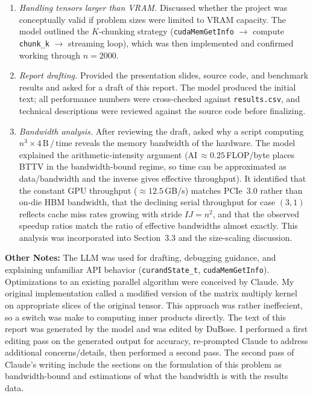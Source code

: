 \documentclass[11pt]{article}
\begin{document}
\begin{enumerate}
  \item \textit{Handling tensors larger than VRAM.} Discussed whether the
        project was conceptually valid if problem sizes were limited to VRAM
        capacity.  The model outlined the $K$-chunking strategy
        (\texttt{cudaMemGetInfo} $\to$ compute \texttt{chunk\_k} $\to$
        streaming loop), which was then implemented and confirmed working
        through $n{=}2000$.

  \item \textit{Report drafting.} Provided the presentation slides, source
        code, and benchmark results and asked for a draft of this report.
        The model produced the initial text; all performance numbers were
        cross-checked against \texttt{results.csv}, and technical descriptions
        were reviewed against the source code before finalizing.

  \item \textit{Bandwidth analysis.} After reviewing the draft, asked why a
        script computing $n^3 \times 4\,\text{B}\,/\,\text{time}$ reveals the
        memory bandwidth of the hardware.  The model explained the
        arithmetic-intensity argument (AI\,$\approx 0.25$\,FLOP/byte places
        BTTV in the bandwidth-bound regime, so time can be approximated as data/bandwidth
        and the inverse gives effective throughput).  It identified that the
        constant GPU throughput (${\approx}12.5$\,GB/s) matches PCIe~3.0 rather
        than on-die HBM bandwidth, that the declining serial throughput for
        case $(3,1)$ reflects cache miss rates growing with stride $IJ=n^2$,
        and that the observed speedup ratios match the ratio of effective
        bandwidths almost exactly.  This analysis was incorporated into
        Section~3.3 and the size-scaling discussion.
\end{enumerate}

\textbf{Other Notes:} 
The LLM was used for drafting, debugging guidance, and explaining
unfamiliar API behavior (\texttt{curandState\_t}, \texttt{cudaMemGetInfo}). 
Optimizations to an existing parallel algorithm were conceived by Claude.
My original implementation called a modified version of the matrix multiply kernel on appropriate slices of the original tensor. This approach was rather ineffecient, so a switch was make to computing inner products directly.
The text of this report was generated by the model and was edited by DuBose.
I performed a first editing pass on the generated output for accuracy, re-prompted Claude to address
additional concerns/details, then performed a second pass. The second pass of Claude's writing include 
the sections on the formulation of this problem as bandwidth-bound and estimations of what the bandwidth
is with the results data.
\end{document}
